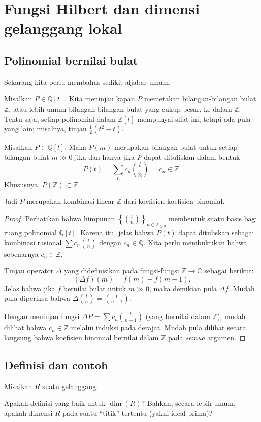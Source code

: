 \section{Fungsi Hilbert dan dimensi gelanggang lokal}
\subsection{Polinomial bernilai bulat}

Sekarang kita perlu membahas sedikit aljabar umum.

Misalkan $P \in \mathbb{Q}[t]$. Kita meninjau kapan $P$ memetakan
bilangan-bilangan bulat $\mathbb{Z}$, atau lebih umum bilangan-bilangan bulat yang cukup besar, ke dalam
$\mathbb{Z}$. Tentu saja, setiap polinomial dalam $\mathbb{Z}[t]$ mempunyai sifat ini, tetapi
ada pula yang lain; misalnya, tinjau $\frac{1}{2}(t^2 -t)$.

\begin{proposition}\label{integervalued} 
Misalkan $P \in \mathbb{Q}[t]$. Maka $P(m)$ merupakan bilangan bulat untuk setiap bilangan bulat $m \gg 0$ jika dan hanya jika
$P$ dapat dituliskan dalam bentuk
\[ P(t) = \sum_n c_n \binom{t}{n}, \quad c_n \in \mathbb{Z}.  \]
Khususnya, $P(\mathbb{Z}) \subset \mathbb{Z}$.
\end{proposition} 
Jadi $P$ merupakan kombinasi linear-$\mathbb{Z}$ dari koefisien-koefisien binomial. 
\begin{proof} 
Perhatikan bahwa himpunan $\left\{\binom{t}{n}\right\}_{n \in \mathbb{Z}_{\geq 0}}$ membentuk suatu basis bagi ruang
polinomial $\mathbb{Q}[t]$. Karena itu, jelas bahwa $P(t)$ dapat dituliskan sebagai
kombinasi rasional $\sum c_n \binom{t}{n}$ dengan $c_n \in \mathbb{Q}$.
Kita perlu membuktikan bahwa sebenarnya $c_n \in \mathbb{Z}$.

Tinjau operator $\Delta$ yang didefinisikan pada fungsi-fungsi $\mathbb{Z} \to
\mathbb{C}$ sebagai berikut:
\[( \Delta f)(m) = f(m) - f(m-1).  \]
Jelas bahwa jika $f$ bernilai bulat untuk $m \gg 0$, maka demikian pula
$\Delta f$. Mudah pula diperiksa bahwa $\Delta \binom{t}{n} =
\binom{t}{n-1}$.

Dengan meninjau
fungsi $\Delta P = \sum c_n \binom{t}{n-1}$ (yang bernilai dalam $\mathbb{Z}$), mudah dilihat bahwa $c_n \in \mathbb{Z}$ melalui induksi
pada derajat. 
Mudah pula dilihat secara langsung bahwa koefisien binomial bernilai dalam
$\mathbb{Z}$ pada \emph{semua} argumen.
\end{proof} 



\subsection{Definisi dan contoh}
Misalkan $R$ suatu gelanggang. 
\begin{question} 
Apakah definisi yang baik untuk $\dim(R)$? Bahkan, secara lebih umum, 
apakah dimensi $R$ pada suatu ``titik'' tertentu (yakni ideal prima)?
\end{question} 

